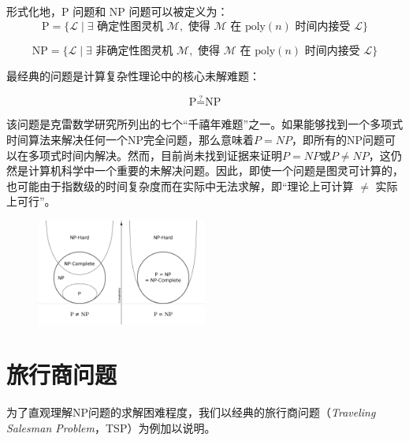 \documentclass[UTF8,openany,zihao=5]{ctexbook}
\begin{document}
形式化地，P 问题和 NP 问题可以被定义为：
\begin{equation}
\text{P} = \{\mathcal{L} \mid \exists \text{ 确定性图灵机 } \mathcal{M}, \text{ 使得 } \mathcal{M} \text{ 在 } \text{poly}(n) \text{ 时间内接受 } \mathcal{L}\}
\end{equation}

\begin{equation}
\text{NP} = \{\mathcal{L} \mid \exists \text{ 非确定性图灵机 } \mathcal{M}, \text{ 使得 } \mathcal{M} \text{ 在 } \text{poly}(n) \text{ 时间内接受 } \mathcal{L}\}
\end{equation}

最经典的问题是计算复杂性理论中的核心未解难题：

\begin{equation}
\text{P} \stackrel{?}{=} \text{NP}
\end{equation}

该问题是克雷数学研究所列出的七个“千禧年难题”之一\cite{ClayMath_PNP}。如果能够找到一个多项式时间算法来解决任何一个NP完全问题，那么意味着$P=NP$，即所有的NP问题可以在多项式时间内解决。然而，目前尚未找到证据来证明$P=NP$或$P\ne NP$，这仍然是计算机科学中一个重要的未解决问题。因此，即使一个问题是图灵可计算的，也可能由于指数级的时间复杂度而在实际中无法求解，即“理论上可计算 $\ne$ 实际上可行”。

\begin{figure}[h]
  \begin{center}
    \includegraphics[width=0.5\textwidth]{images/pandnp.png}
    \centering
  \end{center}
  \vspace{-3ex}
\end{figure}

\section{旅行商问题}

为了直观理解NP问题的求解困难程度，我们以经典的旅行商问题（\textit{Traveling Salesman Problem}，TSP）为例加以说明。
\end{document}
